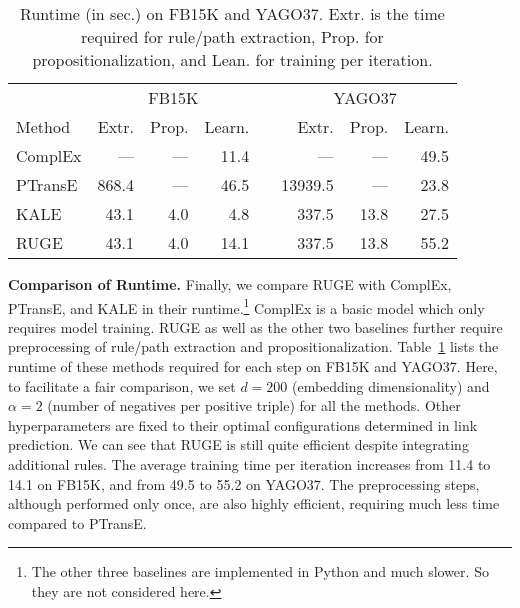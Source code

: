 \documentclass[letterpaper]{article} \usepackage{aaai18}  \usepackage{times}  \usepackage{helvet}  \usepackage{courier}  \usepackage{url}  \usepackage{graphicx}  \usepackage{amsmath}
\begin{document}
\begin{table}[t]
    \centering\footnotesize\setlength{\tabcolsep}{2pt}
    \caption{\label{tab:Runtime} Runtime (in sec.) on FB15K and YAGO37. Extr. is the time required for rule/path extraction, Prop. for propositionalization, and Lean. for training per iteration.}
    \begin{tabular*}{0.47 \textwidth}{@{\extracolsep{\fill}}@{}lrrrrrrr@{}}
    \toprule
    & \multicolumn{3}{c}{FB15K} && \multicolumn{3}{c}{YAGO37} \\\cmidrule{2-4}\cmidrule{6-8}
    Method  & Extr. & Prop. & Learn. && Extr. & Prop. & Learn. \\
    \midrule
    ComplEx & ---   & --- & 11.4 && ---     & ---   & 49.5 \\
    PTransE & 868.4 & --- & 46.5 && 13939.5 & ---   & 23.8 \\
    KALE    & 43.1  & 4.0 & 4.8  && 337.5   & 13.8  & 27.5 \\
    RUGE    & 43.1  & 4.0 & 14.1 && 337.5   & 13.8  & 55.2 \\
    \bottomrule
    \end{tabular*}
\end{table}

\smallskip
\noindent\textbf{Comparison of Runtime.} Finally, we compare RUGE with ComplEx, PTransE, and KALE in their runtime.\footnote{The other three baselines are implemented in Python and much slower. So they are not considered here.} ComplEx is a basic model which only requires model training. RUGE as well as the other two baselines further require preprocessing of rule/path extraction and propositionalization. Table~\ref{tab:Runtime} lists the runtime of these methods required for each step on FB15K and YAGO37. Here, to facilitate a fair comparison, we set $d\!=\!200$ (embedding dimensionality) and $\alpha\!=\!2$ (number of negatives per positive triple) for all the methods. Other hyperparameters are fixed to their optimal configurations determined in link prediction. We can see that RUGE is still quite efficient despite integrating additional rules. The average training time per iteration increases from 11.4 to 14.1 on FB15K, and from 49.5 to 55.2 on YAGO37. The preprocessing steps, although performed only once, are also highly efficient, requiring much less time compared to PTransE.
\end{document}
